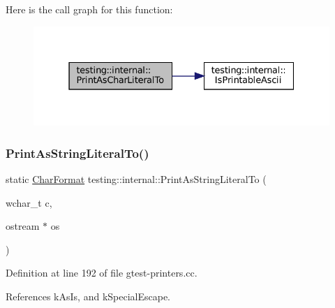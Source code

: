 Here is the call graph for this function\+:
\nopagebreak
\begin{figure}[H]
\begin{center}
\leavevmode
\includegraphics[width=331pt]{namespacetesting_1_1internal_ab73d250fde6dfbf16111afb7a071dc3f_cgraph}
\end{center}
\end{figure}
\mbox{\label{namespacetesting_1_1internal_a8c5838995d7bb9e4232b69e6bcdb9ab8}} 
\subsubsection{\texorpdfstring{Print\+As\+String\+Literal\+To()}{PrintAsStringLiteralTo()}\hspace{0.1cm}{\footnotesize\ttfamily [1/2]}}
{\footnotesize\ttfamily static \hyperlink{namespacetesting_1_1internal_ae2ef98247c76a50cdc80ceb4a6c81793}{Char\+Format} testing\+::internal\+::\+Print\+As\+String\+Literal\+To (\begin{DoxyParamCaption}\item[{wchar\+\_\+t}]{c,  }\item[{ostream $\ast$}]{os }\end{DoxyParamCaption})\hspace{0.3cm}{\ttfamily [static]}}



Definition at line 192 of file gtest-\/printers.\+cc.



References k\+As\+Is, and k\+Special\+Escape.


